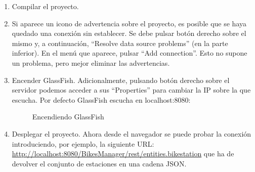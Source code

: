 \begin{enumerate}
	\item Compilar el proyecto.
	\item Si aparece un icono de advertencia sobre el proyecto, es posible que se haya quedado una conexión sin establecer. Se debe pulsar botón derecho sobre el mismo y, a continuación, ``Resolve data source problems'' (en la parte inferior). En el menú que aparece, pulsar ``Add connection''. Esto no supone un problema, pero mejor eliminar las advertencias.
	\item Encender GlassFish. Adicionalmente, pulsando botón derecho sobre el servidor podemos acceder a sus ``Properties'' para cambiar la IP sobre la que escucha. Por defecto GlassFish escucha en localhost:8080:
	\begin{figure} [!htb]
		\centering
		\caption{Encendiendo GlassFish}
		\label{fig:server_8}
	\end{figure}
	\FloatBarrier
	\item Desplegar el proyecto. Ahora desde el navegador se puede probar la conexión introduciendo, por ejemplo, la siguiente URL: \url{http://localhost:8080/BikesManager/rest/entities.bikestation} que ha de devolver el conjunto de estaciones en una cadena JSON.
\end{enumerate}


